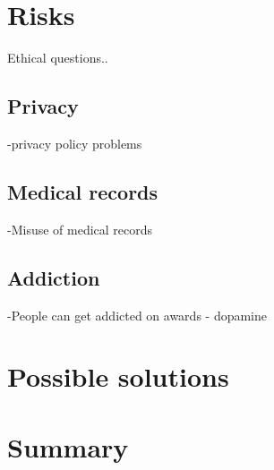 \documentclass[10pt,twoside,english,a4paper]{article}
\begin{document}


%
%
%

\section{Risks} \label{risks}
Ethical questions..

\subsection{Privacy}\label{privacy}
-privacy policy problems

\subsection{Medical records} \label{records}
-Misuse of medical records

\subsection{Addiction} \label {addiction}
-People can get addicted on awards - dopamine

%
%
%

\section{Possible solutions} \label{solutions}

%
%
%

\section{Summary} \label{summary} %

%
%
%


\end{document}
